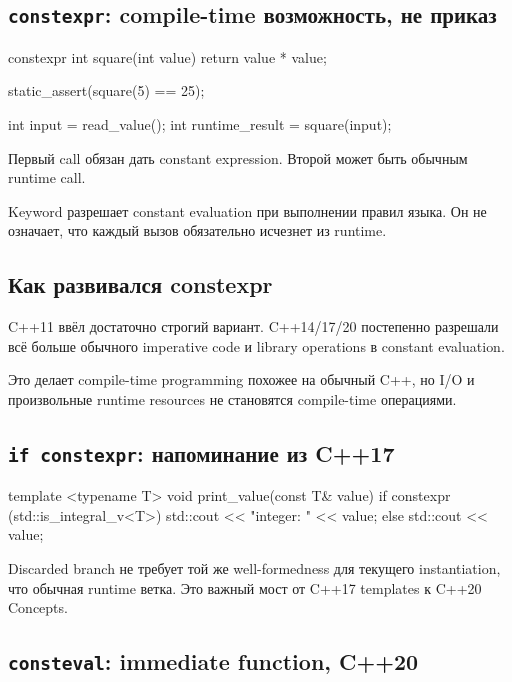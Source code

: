 \subsection{\texttt{constexpr}: compile-time возможность, не приказ}

\begin{cppcode}
constexpr int square(int value) {
    return value * value;
}

static_assert(square(5) == 25);

int input = read_value();
int runtime_result = square(input);
\end{cppcode}

Первый call обязан дать constant expression. Второй может быть обычным runtime
call.

\begin{warningbox}
Keyword разрешает constant evaluation при выполнении правил языка. Он не
означает, что каждый вызов обязательно исчезнет из runtime.
\end{warningbox}

\subsection{Как развивался constexpr}

C++11 ввёл достаточно строгий вариант. C++14/17/20 постепенно разрешали всё
больше обычного imperative code и library operations в constant evaluation.

Это делает compile-time programming похожее на обычный C++, но I/O и
произвольные runtime resources не становятся compile-time операциями.

\subsection{\texttt{if constexpr}: напоминание из C++17}

\begin{cppcode}
template <typename T>
void print_value(const T& value) {
    if constexpr (std::is_integral_v<T>) {
        std::cout << "integer: " << value;
    } else {
        std::cout << value;
    }
}
\end{cppcode}

Discarded branch не требует той же well-formedness для текущего instantiation,
что обычная runtime ветка. Это важный мост от C++17 templates к C++20 Concepts.

\subsection{\texttt{consteval}: immediate function, C++20}

